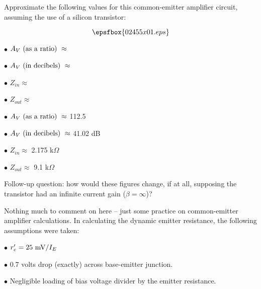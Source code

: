 

Approximate the following values for this common-emitter amplifier circuit, assuming the use of a silicon transistor:

$$\epsfbox{02455x01.eps}$$

\medskip
\goodbreak
\item{$\bullet$} $A_V \hbox{ (as a ratio) } \approx$ 
\item{$\bullet$} $A_V \hbox{ (in decibels) } \approx$ 
\item{$\bullet$} $Z_{in} \approx$ 
\item{$\bullet$} $Z_{out} \approx$ 
\medskip







\medskip
\goodbreak
\item{$\bullet$} $A_V \hbox{ (as a ratio) } \approx$ 112.5
\item{$\bullet$} $A_V \hbox{ (in decibels) } \approx$ 41.02 dB
\item{$\bullet$} $Z_{in} \approx$ 2.175 k$\Omega$
\item{$\bullet$} $Z_{out} \approx$ 9.1 k$\Omega$
\medskip

\vskip 10pt

Follow-up question: how would these figures change, if at all, supposing the transistor had an infinite current gain ($\beta = \infty$)?







Nothing much to comment on here -- just some practice on common-emitter amplifier calculations.  In calculating the dynamic emitter resistance, the following assumptions were taken:

\medskip
\item{$\bullet$} $r'_e = 25 \hbox{ mV} / I_E$
\item{$\bullet$} 0.7 volts drop (exactly) across base-emitter junction.
\item{$\bullet$} Negligible loading of bias voltage divider by the emitter resistance.
\medskip

